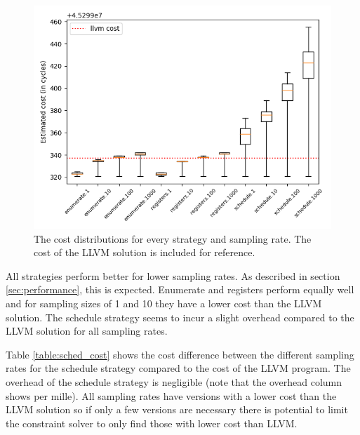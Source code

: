 \begin{figure}[h]
	\centering
	\includegraphics[width=\textwidth,height=0.5\textheight]{results/figures/cost}
	\caption{The cost distributions for every strategy and sampling rate. The cost of the LLVM solution is included for reference.}
	\label{fig:cost}
\end{figure}

All strategies perform better for lower sampling rates. As described in section
\ref{sec:performance}, this is expected. Enumerate and registers perform equally well and
for sampling sizes of 1 and 10 they have a lower cost than the LLVM solution. The schedule
strategy seems to incur a slight overhead compared to the LLVM solution for all sampling
rates.

\begin{table}[h]
		\centering
		\noindent\makebox[\textwidth]{%
			
		}
		\caption{The cost of the different sampling rates for the schedule strategy compared to the LLVM solution.%
		The difference column is the difference between the median cost of the sampling rate and the cost of the LLVM solution.}
		\label{table:sched_cost}
\end{table}

Table \ref{table:sched_cost} shows the cost difference between the different sampling
rates for the schedule strategy compared to the cost of the LLVM program. The overhead of
the schedule strategy is negligible (note that the overhead column shows per mille). All
sampling rates have versions with a lower cost than the LLVM solution so if only a few
versions are necessary there is potential to limit the constraint solver to only find
those with lower cost than LLVM.

